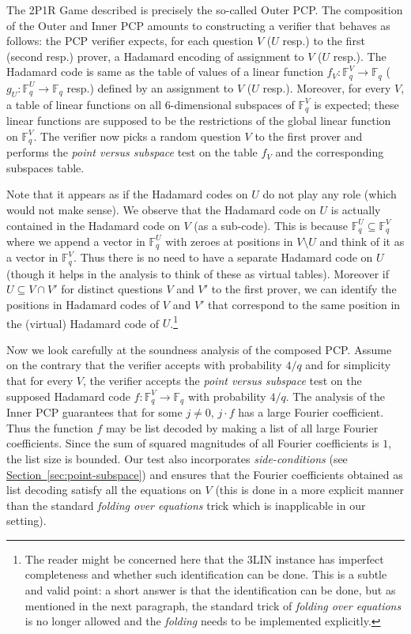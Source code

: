 \documentclass[10pt]{article}
\theoremstyle{definition}
\numberwithin{equation}{section}
\newcommand{\expref}[2]{\texorpdfstring{\hyperref[#2]{#1~\ref{#2}}}{#1~\ref{#2}}}
\newcommand\F{\mathbb{F}}
\renewcommand{\mapsto}{\to}
\begin{document}
The 2P1R Game described is precisely the so-called Outer PCP\@. The composition of the
Outer and Inner PCP amounts to constructing a verifier that behaves as follows: the
PCP verifier expects, for each question $V$ ($U$ resp.) to the first (second resp.)
prover, a Hadamard encoding of assignment to $V$ ($U$ resp.). The Hadamard code is
same as the table of values of a linear function $f_V : \F_q^V \mapsto \F_q$ ($g_U: \F_q^U \mapsto \F_q$ resp.)
defined by an assignment to $V$ ($U$ resp.). Moreover, for every
$V$, a table of linear functions on all $6$-dimensional subspaces of $\F_q^V$ is
expected; these linear functions are supposed to be the restrictions of the global
linear function on $\F_q^V$. The verifier now picks a random question $V$ to the
first prover and performs the \emph{point versus subspace} test on the table
$f_V$ and the corresponding subspaces table.


Note that it appears as if the Hadamard codes on $U$ do not play any role (which would
not make sense). We observe that the Hadamard code on $U$ is actually contained in
the Hadamard code on $V$ (as a sub-code). This is because $\F_q^U \subseteq \F_q^V$ where
we append a vector in $\F_q^U$ with zeroes at positions in $V \setminus U$
and think of it as a vector in  $\F_q^V$. Thus there is no need to have a separate
Hadamard code on $U$ (though it helps in the analysis to think of these as virtual
tables). Moreover if $U \subseteq V \cap V'$ for distinct questions $V$ and $V'$ to the
first prover, we can identify the positions in Hadamard codes of $V$ and $V'$ that
correspond to the same position in the (virtual) Hadamard code of $U$.\footnote{The
reader might be concerned here that the 3LIN instance has imperfect
completeness and whether such identification can be done. This is a subtle and valid point:
a short answer is that
the identification can be done, but as mentioned in the next paragraph, the standard trick of \emph{folding over equations}
is no longer allowed and the \emph{folding} needs to be implemented explicitly.}

Now we look carefully at the soundness analysis of the composed PCP\@. Assume on the
contrary that the verifier
accepts with probability ${4}/{q}$ and for simplicity that for every $V$,
the verifier accepts
 the \emph{point versus subspace} test on the supposed Hadamard code
$f: \F_q^V \mapsto \F_q$ with probability ${4}/{q}$. The analysis of the Inner PCP
guarantees that for some $j \not=0$, $j\cdot f$ has a large Fourier coefficient.
Thus the function $f$ may be list decoded by making a list of all large Fourier
coefficients. Since the sum of squared magnitudes of all Fourier coefficients is $1$, the list size
is bounded. Our test also incorporates \emph{side-conditions} (see \expref{Section}{sec:point-subspace}) and ensures that
 the Fourier coefficients
obtained as list decoding satisfy all the equations on $V$ (this is done
in a more explicit manner than the standard \emph{folding over equations}
trick which is
inapplicable in our setting).
\end{document}
